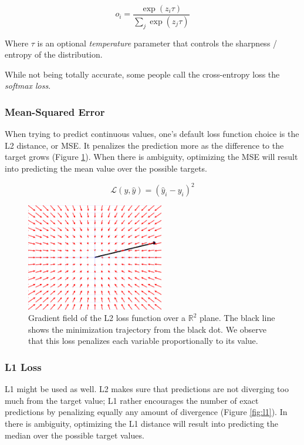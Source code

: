 \begin{equation}
    o_i = \frac{\exp (z_i \tau)}{\sum_j \exp (z_j \tau)}
\end{equation}

Where $\tau$ is an optional \emph{temperature} parameter that controls the sharpness / entropy of the distribution.

While not being totally accurate, some people call the cross-entropy loss the \emph{softmax loss}.

\subsubsection{Mean-Squared Error}

When trying to predict continuous values, one's default loss function choice is the L2 distance, or \ac{MSE}. It penalizes the prediction more as the difference to the target grows (Figure \ref{fig:l2}). When there is ambiguity, optimizing the MSE will result into predicting the mean value over the possible targets.

\begin{equation}
    \mathcal{L}(y, \hat{y}) = (\hat{y}_i - y_i)^2
\end{equation}

\begin{figure}[h]
    \centering
    \includegraphics[width=6cm]{30-activity/l2.png}
    \caption{Gradient field of the L2 loss function over a $\mathbb{R}^2$ plane. The black line shows the minimization trajectory from the black dot. We observe that this loss penalizes each variable proportionally to its value.}
    \label{fig:l2}
\end{figure}

\subsubsection{L1 Loss}

L1 might be used as well. L2 makes sure that predictions are not diverging too much from the target value; L1 rather encourages the number of exact predictions by penalizing equally any amount of divergence (Figure \ref{fig:l1}). In there is ambiguity, optimizing the L1 distance will result into predicting the median over the possible target values.

